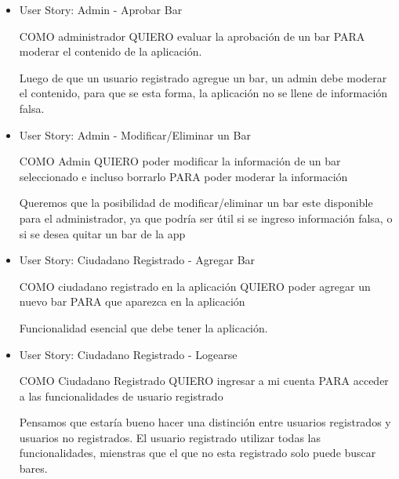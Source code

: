 \begin{itemize}
    
    \item User Story: Admin - Aprobar Bar
    
    COMO administrador QUIERO evaluar la aprobación de un bar PARA moderar el contenido de la aplicación.

     Luego de que un usuario registrado agregue un bar, un admin debe moderar el contenido, para que se esta forma, la aplicación no se llene de información falsa.
    
    
    
    
    \item User Story: Admin - Modificar/Eliminar un Bar
    
    COMO Admin QUIERO poder modificar la información de un bar seleccionado e incluso borrarlo PARA poder moderar la información
    
     Queremos que la posibilidad de modificar/eliminar un bar este disponible para el administrador, ya que podría ser útil si se ingreso información falsa, o si se desea quitar un bar de la app
    
    
    
    
    \item User Story: Ciudadano Registrado - Agregar Bar
    
    COMO ciudadano registrado en la aplicación QUIERO poder agregar un nuevo bar PARA que aparezca en la aplicación
    
     Funcionalidad esencial que debe tener la aplicación.

    \item User Story: Ciudadano Registrado - Logearse
    
    COMO Ciudadano Registrado QUIERO ingresar a mi cuenta PARA acceder a las funcionalidades de usuario registrado
    
     Pensamos que estaría bueno hacer una distinción entre usuarios registrados y usuarios no registrados. El usuario registrado utilizar todas las funcionalidades, mienstras que el que no esta registrado solo puede buscar bares.
    

\end{itemize}
